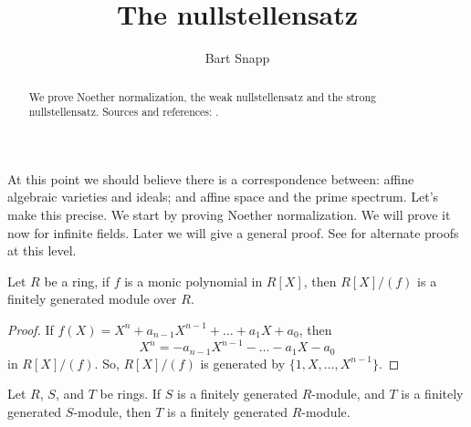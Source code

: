 \documentclass{ximera}
\author{Bart Snapp}
\title{The nullstellensatz}
\begin{document}
\begin{abstract}
  We prove Noether normalization, the weak nullstellensatz and the
  strong nullstellensatz. Sources and references:
  \cite{AM1969,dE1995,hM1986,mR1995}.
\end{abstract}
\maketitle


At this point we should believe there is a correspondence between:
affine algebraic varieties and ideals; and affine space and the prime
spectrum. Let's make this precise. We start by proving Noether
normalization. We will prove it now for infinite fields. Later we will
give a general proof. See \cite{iK1966,gK2011,eK1991} for alternate
proofs at this level.


\begin{proposition}\label{P:finiteext}
  Let $R$ be a ring, if $f$ is a monic polynomial in $R[X]$, then
  $R[X]/(f)$ is a finitely generated module over $R$.
  \begin{proof}
    If $f(X) = X^n + a_{n-1}X^{n-1} + \dots + a_1 X + a_0$, then
    \[
    X^n = -a_{n-1}X^{n-1} - \dots - a_1 X - a_0
    \]
    in $R[X]/(f)$. So, $R[X]/(f)$ is generated by
    $\{1,X,\dots,X^{n-1}\}$.
  \end{proof}
\end{proposition}

\begin{proposition}
  Let $R$, $S$, and $T$ be rings. If $S$ is a finitely generated
  $R$-module, and $T$ is a finitely generated $S$-module, then $T$ is
  a finitely generated $R$-module.
\end{proposition}
\end{document}
